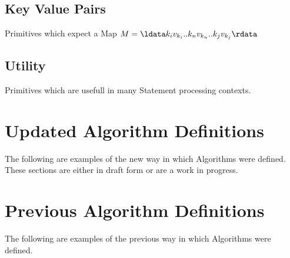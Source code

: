 \documentclass{article}
\begin{document}
\subsection{Key Value Pairs}
Primitives which expect a Map $M = \ldata k_{i}v_{k_{i}}..k_{n}v_{k_{n}}..k_{j}v_{k_{j}} \rdata$



\subsection{Utility}
Primitives which are usefull in many Statement processing contexts.



\section*{Updated Algorithm Definitions}
The following are examples of the new way in which Algorithms were defined. These sections are either in draft form or are a work in progress.





\section*{Previous Algorithm Definitions}
The following are examples of the previous way in which Algorithms were defined.






\end{document}
